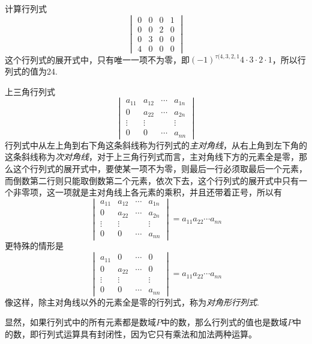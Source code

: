 \begin{example}
  计算行列式
  \[
    \begin{vmatrix}
      0 & 0 & 0 & 1 \\
      0 & 0 & 2 & 0 \\
      0 & 3 & 0 & 0 \\
      4 & 0 & 0 & 0
    \end{vmatrix}
    \]
    这个行列式的展开式中，只有唯一一项不为零，即$(-1)^{\tau(4,3,2,1}4\cdot 3 \cdot 2 \cdot 1$，所以行列式的值为24.
\end{example}

\begin{example}
  上三角行列式
  \[
    \begin{vmatrix}
      a_{11} & a_{12} & \cdots & a_{1n} \\
      0 & a_{22} & \cdots & a_{2n} \\
      \vdots & \vdots & & \vdots \\
      0 & 0 & \cdots & a_{nn}
    \end{vmatrix}
  \]
  行列式中从左上角到右下角这条斜线称为行列式的\emph{主对角线}，从右上角到左下角的这条斜线称为\emph{次对角线}，对于上三角行列式而言，主对角线下方的元素全是零，那么这个行列式的展开式中，要使某一项不为零，则最后一行必须取最后一个元素，而倒数第二行则只能取倒数第二个元素，依次下去，这个行列式的展开式中只有一个非零项，这一项就是主对角线上各元素的乘积，并且还带着正号，所以有
  \[
    \begin{vmatrix}
      a_{11} & a_{12} & \cdots & a_{1n} \\
      0 & a_{22} & \cdots & a_{2n} \\
      \vdots & \vdots & & \vdots \\
      0 & 0 & \cdots & a_{nn}
    \end{vmatrix}
    = a_{11}a_{22}\cdots a_{nn}
  \]
  更特殊的情形是
   \[
    \begin{vmatrix}
      a_{11} & 0 & \cdots & 0 \\
      0 & a_{22} & \cdots & 0 \\
      \vdots & \vdots & & \vdots \\
      0 & 0 & \cdots & a_{nn}
    \end{vmatrix}
    = a_{11}a_{22}\cdots a_{nn}
  \]
像这样，除主对角线以外的元素全是零的行列式，称为\emph{对角形行列式}.
\end{example}

显然，如果行列式中的所有元素都是数域$P$中的数，那么行列式的值也是数域$P$中的数，即行列式运算具有封闭性，因为它只有乘法和加法两种运算。

